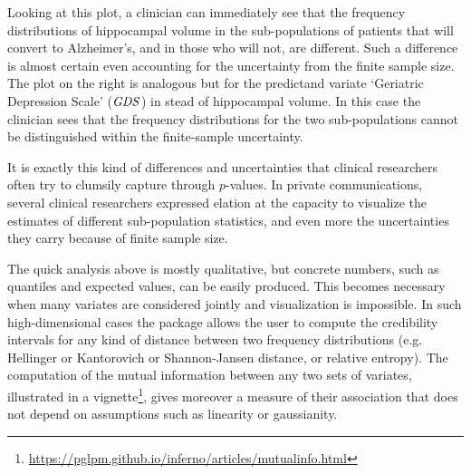 Looking at this plot, a clinician can immediately see that the frequency distributions of hippocampal volume in the sub-populations of patients that will convert to Alzheimer's, and in those who will not, are different. Such a difference is almost certain even accounting for the uncertainty from the finite sample size. The plot on the right is analogous but for the predictand variate `Geriatric Depression Scale' ($\mathit{GDS}$) in stead of hippocampal volume. In this case the clinician sees that the frequency distributions for the two sub-populations cannot be distinguished within the finite-sample uncertainty.

It is exactly this kind of differences and uncertainties that clinical researchers often try to clumsily capture through $p$-values. In private communications, several clinical researchers expressed elation at the capacity to visualize the estimates of different sub-population statistics, and even more the uncertainties they carry because of finite sample size.

The quick analysis above is mostly qualitative, but concrete numbers, such as quantiles and expected values, can be easily produced. This becomes necessary when many variates are considered jointly and visualization is impossible. In such high-dimensional cases the package allows the user to compute the credibility intervals for any kind of distance between two frequency distributions (e.g. Hellinger or Kantorovich or Shannon-Jansen distance, or relative entropy). The computation of the mutual information between any two sets of variates, illustrated in a vignette\footnote{\url{https://pglpm.github.io/inferno/articles/mutualinfo.html}}, gives moreover a measure of their association that does not depend on assumptions such as linearity or gaussianity.

